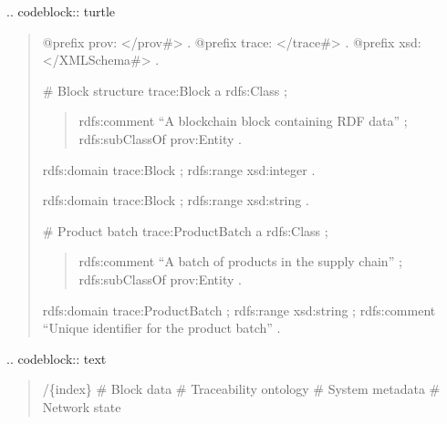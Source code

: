 \documentclass[letterpaper,10pt,english]{sphinxmanual}
\begin{document}
\sphinxAtStartPar
{}
.. code\sphinxhyphen{}block:: turtle
\begin{quote}

\sphinxAtStartPar
@prefix prov: \textless{}/prov\#\textgreater{} .
@prefix trace: \textless{}/trace\#\textgreater{} .
@prefix xsd: \textless{}/XMLSchema\#\textgreater{} .

\sphinxAtStartPar
\# Block structure
trace:Block a rdfs:Class ;
\begin{quote}

\sphinxAtStartPar
rdfs:comment “A blockchain block containing RDF data” ;
rdfs:subClassOf prov:Entity .
\end{quote}
\begin{description}
\sphinxAtStartPar
rdfs:domain trace:Block ;
rdfs:range xsd:integer .

\sphinxAtStartPar
rdfs:domain trace:Block ;
rdfs:range xsd:string .

\end{description}

\sphinxAtStartPar
\# Product batch
trace:ProductBatch a rdfs:Class ;
\begin{quote}

\sphinxAtStartPar
rdfs:comment “A batch of products in the supply chain” ;
rdfs:subClassOf prov:Entity .
\end{quote}
\begin{description}
\sphinxAtStartPar
rdfs:domain trace:ProductBatch ;
rdfs:range xsd:string ;
rdfs:comment “Unique identifier for the product batch” .

\end{description}
\end{quote}

\sphinxAtStartPar
{}
.. code\sphinxhyphen{}block:: text
\begin{quote}

\sphinxAtStartPar
{}/\{index\}     \# Block data
          \# Traceability ontology
          \# System metadata
           \# Network state
\end{quote}
\end{document}
